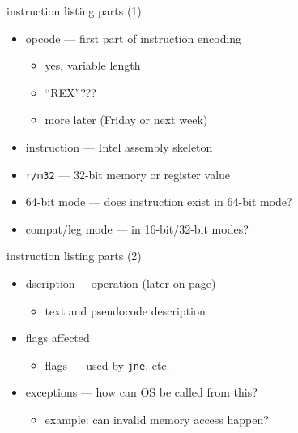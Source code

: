 \begin{frame}{instruction listing parts (1)}
    \begin{itemize}
    \item opcode --- first part of instruction encoding
        \begin{itemize}
        \item yes, variable length
        \item ``REX''???
        \item more later (Friday or next week)
        \end{itemize}
    \item instruction --- Intel assembly skeleton
    \item {\tt r/m32} --- 32-bit memory or register value
    \item 64-bit mode --- does instruction exist in 64-bit mode?
    \item compat/leg mode --- in 16-bit/32-bit modes?
    \end{itemize}
\end{frame}

\begin{frame}{instruction listing parts (2)}
    \begin{itemize}
    \item dscription + operation (later on page)
        \begin{itemize}
        \item text and pseudocode description
        \end{itemize}
    \item flags affected
        \begin{itemize}
        \item flags --- used by {\tt jne}, etc.
        \end{itemize}
    \item exceptions --- how can OS be called from this?
        \begin{itemize}
        \item example: can invalid memory access happen?
        \end{itemize}
    \end{itemize}
\end{frame}
